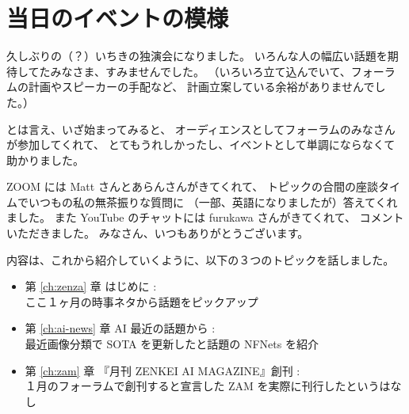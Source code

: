\documentclass[dvipdfmx,autodetect-engine,10pt,b5paper,papersize,openany,dvipsnames]{jsbook}
\begin{document}
\chapter{当日のイベントの模様}
\label{sec:introduction}


久しぶりの（？）いちきの独演会になりました。
いろんな人の幅広い話題を期待してたみなさま、すみませんでした。
（いろいろ立て込んでいて、フォーラムの計画やスピーカーの手配など、
計画立案している余裕がありませんでした。）

とは言え、いざ始まってみると、
オーディエンスとしてフォーラムのみなさんが参加してくれて、
とてもうれしかったし、イベントとして単調にならなくて助かりました。

\vspace{1cm}


ZOOM には Matt さんとあらんさんがきてくれて、
トピックの合間の座談タイムでいつもの私の無茶振りな質問に
（一部、英語になりましたが）答えてくれました。
また YouTube のチャットには furukawa さんがきてくれて、
コメントいただきました。
みなさん、いつもありがとうございます。


内容は、これから紹介していくように、以下の３つのトピックを話しました。
\begin{itemize}
\item 第 \ref{ch:zenza} 章 はじめに :\\
  ここ１ヶ月の時事ネタから話題をピックアップ
\item 第 \ref{ch:ai-news} 章 AI 最近の話題から :\\
  最近画像分類で SOTA を更新したと話題の NFNets を紹介
\item 第 \ref{ch:zam} 章 『月刊 ZENKEI AI MAGAZINE』創刊 :\\
  １月のフォーラムで創刊すると宣言した ZAM を実際に刊行したというはなし
\end{itemize}
\end{document}
